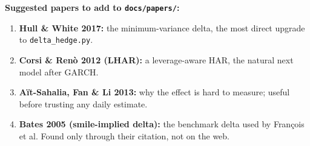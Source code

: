 \documentclass{article}
\begin{document}
\textbf{Suggested papers to add to \texttt{docs/\allowbreak{}papers/\allowbreak{}}:}

\begin{enumerate}

\item \textbf{Hull \& White 2017:} the minimum-variance delta, the most direct upgrade to \texttt{delta\_\allowbreak{}hedge.\allowbreak{}py}.

\item \textbf{Corsi \& Renò 2012 (LHAR):} a leverage-aware HAR, the natural next model after GARCH.

\item \textbf{Aït-Sahalia, Fan \& Li 2013:} why the effect is hard to measure; useful before trusting any daily estimate.

\item \textbf{Bates 2005 (smile-implied delta):} the benchmark delta used by François et al. Found only through their citation, not on the web.

\end{enumerate}
\end{document}

